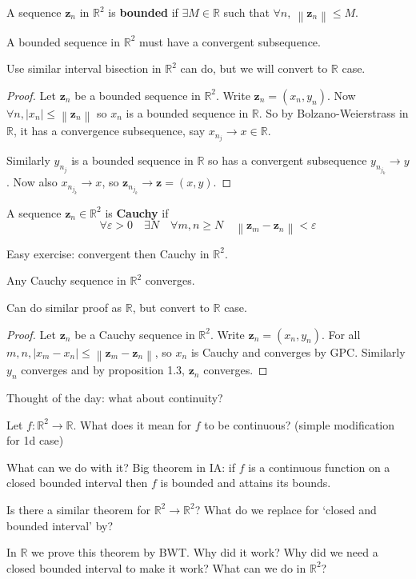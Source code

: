 \documentclass[a4paper]{article}
\renewcommand{\epsilon}{\varepsilon}
\begin{document}
\begin{definition}
    A sequence $\mathbf{z}_n$ in $ \mathbb{R}^{2} $ is \textbf{bounded} if $\exists M\in \mathbb{R}$ such that $ \forall n,\ \left\| \mathbf{z}_n \right\|\le M $. 
\end{definition}

\begin{theorem}
    A bounded sequence in $ \mathbb{R}^{2} $ must have a convergent subsequence.
\end{theorem}
Use similar interval bisection in $ \mathbb{R}^{2} $ can do, but we will convert to $\mathbb{R}$ case. 

\begin{proof}
    Let $ \mathbf{z}_n $ be a bounded sequence in $ \mathbb{R}^{2} $. Write $ \mathbf{z}_n = (x_n,y_n) $. Now $ \forall n, |x_n| \le \left\| \mathbf{z}_n \right\| $ so $x_n$ is a bounded sequence in $ \mathbb{R} $. So by Bolzano-Weierstrass in $ \mathbb{R} $, it has a convergence subsequence, say $ x_{n_j}\to x\in \mathbb{R} $. 

    Similarly $ y_{n_j} $ is a bounded sequence in $ \mathbb{R} $ so has a convergent subsequence $ y_{n_{j_k}}\to y $. Now also $ x_{n_{j_k}} \to x$, so $ \mathbf{z}_{n_{j_k}}\to \mathbf{z}= (x,y) $. 
\end{proof}

\begin{definition}
    A sequence $ \mathbf{z}_n\in \mathbb{R}^{2} $ is \textbf{Cauchy} if 
    \[
        \forall \epsilon>0\quad \exists N\quad \forall m,n\ge N\quad \left\| \mathbf{z}_m-\mathbf{z}_n \right\|<\epsilon
    \]
\end{definition}
Easy exercise: convergent then Cauchy in $ \mathbb{R}^{2} $. 

\begin{theorem}
    Any Cauchy sequence in $ \mathbb{R}^{2} $ converges. 
\end{theorem}
Can do similar proof as $\mathbb{R}$, but convert to $\mathbb{R}$ case. 
\begin{proof}
    Let $ \mathbf{z}_n $ be a Cauchy sequence in $ \mathbb{R}^{2} $. Write $ \mathbf{z}_n = (x_n,y_n) $. For all $ m,n, |x_m-x_n| \le \left\| \mathbf{z}_m-\mathbf{z}_n \right\| $, so $ x_n $ is Cauchy and converges by GPC. Similarly $ y_n $ converges and by proposition 1.3, $ \mathbf{z}_n $ converges.
\end{proof}
Thought of the day: what about continuity? 

Let $ f: \mathbb{R}^{2}\to \mathbb{R} $. What does it mean for $f$ to be continuous? (simple modification for 1d case)

What can we do with it? Big theorem in IA: if $f$ is a continuous function on a closed bounded interval then $f$ is bounded and attains its bounds. 

Is there a similar theorem for $ \mathbb{R}^{2}\to \mathbb{R}^{2} $? 
What do we replace for `closed and bounded interval' by? 

In $ \mathbb{R} $ we prove this theorem by BWT. Why did it work? Why did we need a closed bounded interval to make it work? What can we do in $ \mathbb{R}^{2} $? 
\end{document}
